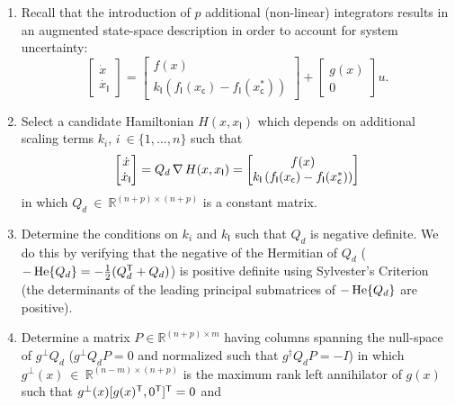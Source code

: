 \begin{enumerate}
\item Recall that the introduction of $p$ additional (non-linear)
  integrators results in an augmented state-space description in
  order to account for system uncertainty:
\begin{equation*}
\begin{bmatrix}\dot{x}\\\dot{x_{\mathsf{I}}}\end{bmatrix} = \begin{bmatrix}f(x) \\
 k_{\mathsf{I}}\left ( f_{\mathsf{I}} (x_{\mathsf{c}}) -
  f_{\mathsf{I}} (x_{\mathsf{c}}^*) \right )\end{bmatrix}+ \begin{bmatrix} g(x)\\
0
\end{bmatrix} u.
\end{equation*}
\item Select a candidate Hamiltonian $H(x,x_{\mathsf{I}})$ which
  depends on additional scaling terms $k_i$, $i\ \in \{1,\dots,n\}$
  such that 
\begin{equation*}
\begin{bmatrix}\dot{x}\\\dot{x}_{\mathsf{I}} \end{bmatrix}= Q_d \operatorname{\nabla} 
  H(x,x_{\mathsf{I}}) = \begin{bmatrix}f(x) \\
 k_{\mathsf{I}}\left ( f_{\mathsf{I}} (x_{\mathsf{c}}) -
  f_{\mathsf{I}} (x_{\mathsf{c}}^*) \right )\end{bmatrix}
\end{equation*}
 in which $Q_d\ \in\ \mathbb{R}^{(n+p) \times (n+p)}$ is a constant matrix.
\item Determine the conditions on $k_i$ and $k_{\mathsf{I}}$ such
  that $Q_d$ is negative definite.  We do this by verifying that the negative of
  the Hermitian of $Q_d$ ($-\operatorname{He}\{Q_d\}=-\frac{1}{2}(Q_d^{\mathsf{T}}+Q_d)$)
  is positive definite using Sylvester's Criterion (the
  determinants of the leading principal submatrices of $-\operatorname{He}\{Q_d\}$ are
  positive).
\item Determine a matrix $P \in \mathbb{R}^{(n+p) \times
    m}$ having columns spanning the null-space of 
  $g^{\bot}Q_d$ ($g^{\bot}Q_dP=0$ and normalized such that
  $g^{\dagger}Q_dP=-I$) in which $g^{\bot}(x)\ \in\
  \mathbb{R}^{(n-m)\times (n+p)}$ is the maximum rank
  left annihilator of $g(x)$ such that $g^{\bot}(x)[g(x)^{\mathsf{T}},0^{\mathsf{T}}]^{\mathsf{T}}=0$ and

\end{enumerate}
